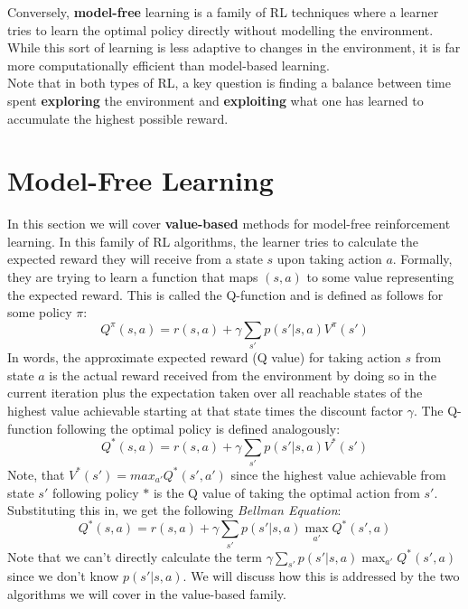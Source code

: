 Conversely, \textbf{model-free} learning is a family of RL techniques where a learner tries to learn the optimal policy directly without modelling the environment. While this sort of learning is less adaptive to changes in the environment, it is far more computationally efficient than model-based learning.\\

Note that in both types of RL, a key question is finding a balance between time spent \textbf{exploring} the environment and \textbf{exploiting} what one has learned to accumulate the highest possible reward. 
\section{Model-Free Learning}
In this section we will cover \textbf{value-based} methods for model-free reinforcement learning. In this family of RL algorithms, the learner tries to calculate the expected reward they will receive from a state $s$ upon taking action $a$. Formally, they are trying to learn a function that maps $(s, a)$ to some value representing the expected reward. This is called the Q-function and is defined as follows for some policy $\pi$:
\begin{equation}
    Q^{\pi}(s, a) = r(s, a) + \gamma\sum_{s'}p(s'|s, a)V^{\pi}(s')
\end{equation}
In words, the approximate expected reward (Q value) for taking action $s$ from state $a$ is the actual reward received from the environment by doing so in the current iteration plus the expectation taken over all reachable states of the highest value achievable starting at that state times the discount factor $\gamma$. The Q-function following the optimal policy is defined analogously:
\begin{equation}
    Q^{*}(s, a) = r(s, a) + \gamma\sum_{s'}p(s'|s, a)V^{*}(s')
\end{equation}
Note, that $V^*(s') = max_{a'}Q^*(s', a')$ since the highest value achievable from state $s'$ following policy $*$ is the Q value of taking the optimal action from $s'$. Substituting this in, we get the following \textit{Bellman Equation}:
\begin{equation}
    Q^*(s, a) = r(s, a) + \gamma\sum_{s'}p(s'|s, a)\max_{a'}Q^*(s', a)
\end{equation}
Note that we can't directly calculate the term $\gamma\sum_{s'}p(s'|s, a)\max_{a'}Q^*(s', a)$ since we don't know $p(s'|s, a)$. We will discuss how this is addressed by the two algorithms we will cover in the value-based family.
